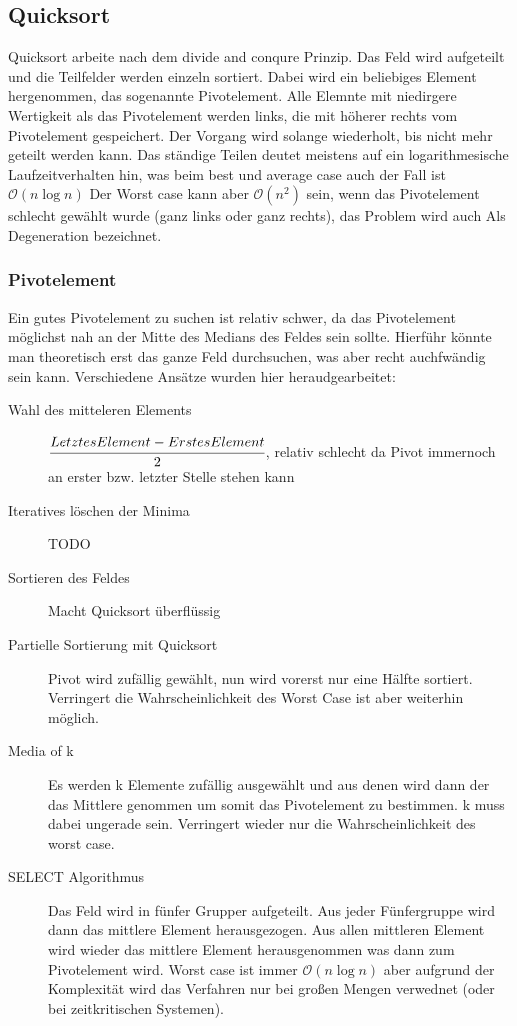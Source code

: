 \documentclass[a4paper]{scrartcl}
\begin{document}
        \subsection{Quicksort}
            Quicksort arbeite nach dem divide and conqure Prinzip. Das Feld wird aufgeteilt und die Teilfelder werden einzeln sortiert. Dabei wird ein
            beliebiges Element hergenommen, das sogenannte Pivotelement. Alle Elemnte mit niedirgere Wertigkeit als das Pivotelement werden links,
            die mit höherer rechts vom Pivotelement gespeichert. Der Vorgang wird solange wiederholt, bis nicht mehr geteilt werden kann. 
            Das ständige Teilen deutet meistens auf ein logarithmesische Laufzeitverhalten hin, was beim best und average case auch der Fall ist \(\mathcal{O}(n \log n)\)
            Der Worst case kann aber \(\mathcal{O}(n^2)\) sein, wenn das Pivotelement schlecht gewählt wurde (ganz links oder ganz rechts), das Problem wird 
            auch Als Degeneration bezeichnet.
            \subsubsection{Pivotelement}
            Ein gutes Pivotelement zu suchen ist relativ schwer, da  das Pivotelement möglichst nah an der Mitte des Medians des Feldes sein sollte. Hierführ könnte
            man theoretisch erst das ganze Feld durchsuchen, was aber recht auchfwändig sein kann. Verschiedene Ansätze wurden hier heraudgearbeitet:
            \begin{description}
                \item[Wahl des mitteleren Elements] \(\cfrac{Letztes Element - Erstes Element}{2}\), relativ schlecht da Pivot immernoch an erster bzw. letzter Stelle stehen kann
                \item[Iteratives löschen der Minima] TODO
                \item[Sortieren des Feldes] Macht Quicksort überflüssig
                \item[Partielle Sortierung mit Quicksort] Pivot wird zufällig gewählt, nun wird vorerst nur eine Hälfte sortiert. Verringert die Wahrscheinlichkeit des Worst Case
                    ist aber weiterhin möglich.
                \item[Media of k] Es werden k Elemente zufällig ausgewählt und aus denen wird dann der das Mittlere genommen um somit das Pivotelement zu bestimmen.
                k muss dabei ungerade sein. Verringert wieder nur die Wahrscheinlichkeit des worst case.
                \item[SELECT Algorithmus] Das Feld wird in fünfer Grupper aufgeteilt. Aus jeder Fünfergruppe wird dann das mittlere Element herausgezogen. Aus allen 
                mittleren Element wird wieder das mittlere Element herausgenommen was dann zum Pivotelement wird. Worst case ist immer \(\mathcal{O}(n \log n)\) aber
                aufgrund der Komplexität wird das Verfahren nur bei großen Mengen verwednet (oder bei zeitkritischen Systemen).
            \end{description} 
\end{document}
